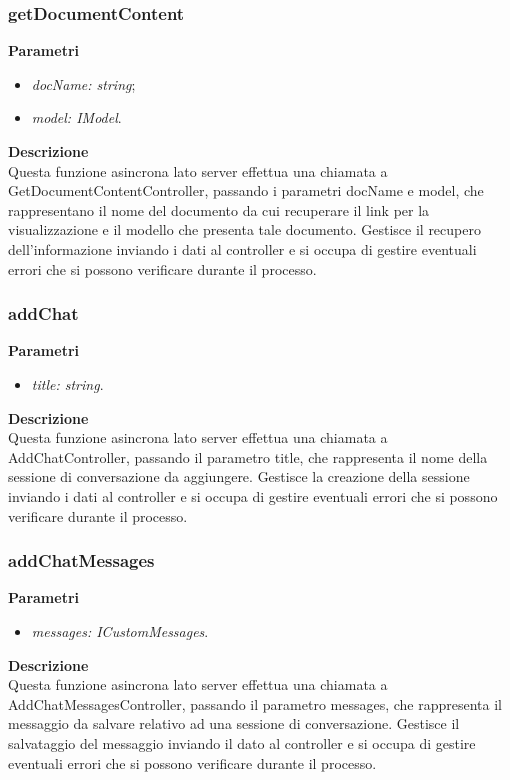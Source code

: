 \subsubsection{getDocumentContent}
\textbf{Parametri}
\begin{itemize}[itemsep=-4pt]
    \item \textit{docName: string};
    \item \textit{model: IModel}.
\end{itemize}
\textbf{Descrizione}\\
Questa funzione asincrona lato server effettua una chiamata a GetDocumentContentController, passando i parametri docName e model, che rappresentano il nome del documento da cui recuperare il link per la visualizzazione e il modello che presenta tale documento. Gestisce il recupero dell'informazione inviando i dati al controller e si occupa di gestire eventuali errori che si possono verificare durante il processo.

\subsubsection{addChat}
\textbf{Parametri}
\begin{itemize}
    \item \textit{title: string}.
\end{itemize}
\textbf{Descrizione}\\
Questa funzione asincrona lato server effettua una chiamata a AddChatController, passando il parametro title, che rappresenta il nome della sessione di conversazione da aggiungere. Gestisce la creazione della sessione inviando i dati al controller e si occupa di gestire eventuali errori che si possono verificare durante il processo.

\subsubsection{addChatMessages}
\textbf{Parametri}
\begin{itemize}
    \item \textit{messages: ICustomMessages}.
\end{itemize}
\textbf{Descrizione}\\
Questa funzione asincrona lato server effettua una chiamata a AddChatMessagesController, passando il parametro messages, che rappresenta il messaggio da salvare relativo ad una sessione di conversazione. Gestisce il salvataggio del messaggio inviando il dato al controller e si occupa di gestire eventuali errori che si possono verificare durante il processo.

